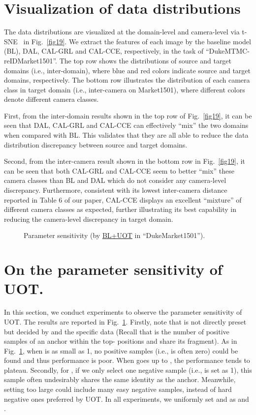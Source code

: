 \documentclass[10pt,twocolumn,letterpaper]{article}
\begin{document}
\renewcommand\thesection{A2}
\section{Visualization of data distributions}
The data distributions are visualized at the domain-level and camera-level via t-SNE~\cite{maaten2008visualizing} in Fig.~\ref{fig19}. We extract the features of each image by the baseline model (BL), DAL, CAL-GRL and CAL-CCE, respectively, in the task of ``DukeMTMC-reIDMarket1501''.  The top row shows the distributions of source and target domains (i.e., inter-domain), where blue and red colors indicate source and target domains, respectively. The bottom row illustrates the distribution of each camera class in target domain (i.e., inter-camera on Market1501), where different colors denote different camera classes. 

First, from the inter-domain results shown in the top row of Fig.~\ref{fig19}, it can be seen that DAL, CAL-GRL and CAL-CCE can effectively ``mix'' the two domains when compared with BL. This validates that they are all able to reduce the data distribution discrepancy between source and target domains. 

Second, from the inter-camera result shown in the bottom row in Fig.~\ref{fig19}, it can be seen that both CAL-GRL and CAL-CCE seem to better ``mix'' these camera classes than BL and DAL which do not consider any camera-level discrepancy. Furthermore, consistent with its lowest inter-camera distance reported in Table 6 of our paper, CAL-CCE displays an excellent ``mixture'' of different camera classes as expected, further illustrating its best capability in reducing the camera-level discrepancy in target domain. \begin{figure}[htb]
\renewcommand\thefigure{A2}
\centering
{}
\caption{\footnotesize Parameter sensitivity (by \underline{BL+UOT} in ``DukeMarket1501'').}
\label{fig10}
\end{figure}



\renewcommand\thesection{A3}
\section{On the parameter sensitivity of UOT.}
In this section, we conduct experiments to observe the parameter sensitivity of UOT. The results are reported in Fig.~\ref{fig10}. Firstly, note that  is not directly preset but decided by  and the specific data (Recall that  is the number of positive samples of an anchor within the top- positions and share its fragment). As in Fig.~\ref{fig10}, when  is as small as 1, no positive samples (i.e.,  is often zero) could be found and thus performance is poor. When  goes up to , the performance tends to plateau. Secondly, for , if we only select one negative sample (i.e.,  is set as 1), this sample often undesirably shares the same identity as the anchor. Meanwhile, setting  too large could include many easy negative samples, instead of hard negative ones preferred by UOT. In all experiments, we uniformly set  and  as  and .
\end{document}
